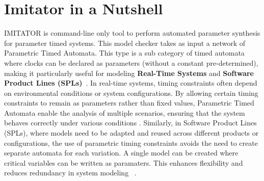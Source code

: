 

\section{Imitator in a Nutshell}

IMITATOR is command-line only tool to perform automated parameter synthesis for parameter timed systems. This model checker takes as input a network of Parametric Timed Automata. This type is a sub category of timed automata where clocks can be declared as parameters (without a constant pre-determined), making it particularly useful for modeling \textbf{Real-Time Systems} and \textbf{Software Product Lines (SPLs)}~\cite{IMITATOR}. In real-time systems, timing constraints often depend on environmental conditions or system configurations. By allowing certain timing constraints to remain as parameters rather than fixed values, Parametric Timed Automata enable the analysis of multiple scenarios, ensuring that the system behaves correctly under various conditions \cite{RealTimeSystems}.
Similarly, in Software Product Lines (SPLs), where models need to be adapted and reused across different products or configurations, the use of parametric timing constraints avoids the need to create separate automata for each variation. A single model can be created where critical variables can be written as paramaters. This enhances flexibility and reduces redundancy in system modeling ~\cite{SPL}.


